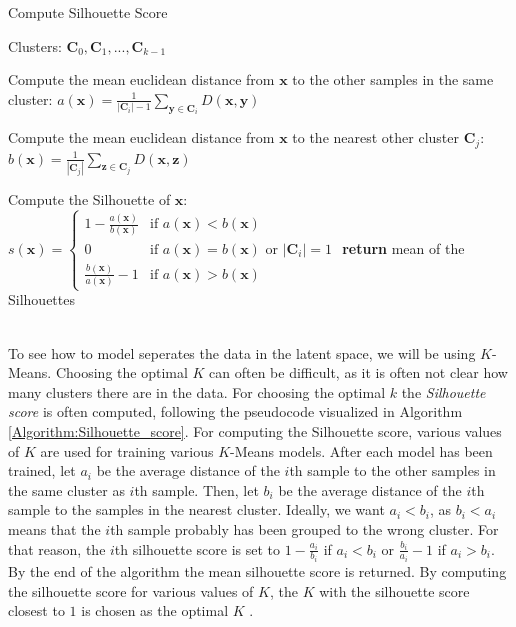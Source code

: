 \documentclass[./main.tex]{subfiles}
\begin{document}
\begin{algorithm}[htbp]
    \caption{Compute Silhouette Score \cite{MAD_L12}}
    \label{Algorithm:Silhouette_score}
    \begin{algorithmic}[1]
        \Require Clusters: $\bm{C}_0, \bm{C}_1, ..., \bm{C}_{k - 1}$
                \State \begin{varwidth}[t]{\linewidth}
                    Compute the mean euclidean distance from $\bm{x}$ to the other samples in the same cluster: $a(\bm{x}) = \frac{1}{|\bm{C}_i| - 1} \sum_{\bm{y} \in \bm{C}_i} D(\bm{x}, \bm{y})$
                \end{varwidth}
                \State \begin{varwidth}[t]{\linewidth}
                Compute the mean euclidean distance from $\bm{x}$ to the nearest other cluster $\bm{C}_j$: $b(\bm{x}) = \frac{1}{| \bm{C}_j |} \sum_{\bm{z} \in \bm{C}_j} D(\bm{x}, \bm{z})$
                \end{varwidth}
                \State Compute the Silhouette of $\bm{x}$:
                \begin{math}
                    s(\bm{x}) =
                    \begin{cases}
                        1 - \frac{a(\bm{x})}{b(\bm{x})} & \text{if } a(\bm{x}) < b(\bm{x}) \\
                        0 & \text{if } a(\bm{x}) = b(\bm{x}) \text{ or } |\bm{C}_i| = 1 \\
                        \frac{b(\bm{x})}{a(\bm{x})} - 1 & \text{if } a(\bm{x}) > b(\bm{x})
                    \end{cases}
                \end{math}
            \EndFor
        \EndFor
        \State \textbf{return} mean of the Silhouettes
    \end{algorithmic}
\end{algorithm}
\\
To see how to model seperates the data in the latent space, we will be using $K$-Means. Choosing the optimal $K$ can often be difficult, as it is often not clear how many clusters there are in the data. For choosing the optimal $k$ the \textit{Silhouette score} is often computed, following the pseudocode visualized in Algorithm \ref{Algorithm:Silhouette_score}. For computing the Silhouette score, various values of $K$ are used for training various $K$-Means models. After each model has been trained, let $a_i$ be the average distance of the $i$th sample to the other samples in the same cluster as $i$th sample. Then, let $b_i$ be the average distance of the $i$th sample to the samples in the nearest cluster. Ideally, we want $a_i < b_i$, as $b_i < a_i$ means that the $i$th sample probably has been grouped to the wrong cluster. For that reason, the $i$th silhouette score is set to $1 - \frac{a_i}{b_i}$ if $a_i < b_i$ or $\frac{b_i}{a_i} - 1$ if $a_i > b_i$. By the end of the algorithm the mean silhouette score is returned. By computing the silhouette score for various values of $K$, the $K$ with the silhouette score closest to $1$ is chosen as the optimal $K$ \cite{MAD_L12}.
\end{document}
